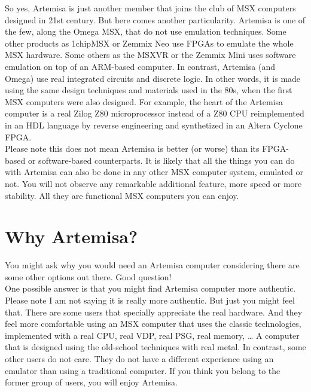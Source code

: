So yes, Artemisa is just another member that joins the club of MSX computers designed in 21st century. But here comes another particularity. Artemisa is one of the few, along the Omega MSX, that do not use emulation techniques. Some other products as 1chipMSX or Zemmix Neo use FPGAs to emulate the whole MSX hardware. Some others as the MSXVR or the Zemmix Mini uses software emulation on top of an ARM-based computer. In contrast, Artemisa (and Omega) use real integrated circuits and discrete logic. In other words, it is made using the same design techniques and materials used in the 80s, when the first MSX computers were also designed. For example, the heart of the Artemisa computer is a real Zilog Z80 microprocessor instead of a Z80 CPU reimplemented in an HDL language by reverse engineering and synthetized in an Altera Cyclone FPGA. \\

Please note this does not mean Artemisa is better (or worse) than its FPGA-based or software-based counterparts. It is likely that all the things you can do with Artemisa can also be done in any other MSX computer system, emulated or not. You will not observe any remarkable additional feature, more speed or more stability. All they are functional MSX computers you can enjoy. \\

\section{Why Artemisa?}

You might ask why you would need an Artemisa computer considering there are some other options out there. Good question! \\

One possible answer is that you might find Artemisa computer more authentic. Please note I am not saying it is really more authentic. But just you might feel that. There are some users that specially appreciate the real hardware. And they feel more comfortable using an MSX computer that uses the classic technologies, implemented with a real CPU, real VDP, real PSG, real memory, … A computer that is designed using the old-school techniques with real metal. In contrast, some other users do not care. They do not have a different experience using an emulator than using a traditional computer. If you think you belong to the former group of users, you will enjoy Artemisa. \\

